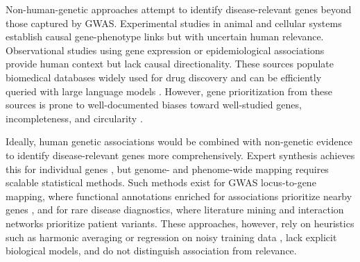 Non-human-genetic approaches attempt to identify disease-relevant genes beyond those captured by GWAS. Experimental studies in animal \cite{seok_genomic_2013,widjaja_inhibiting_2019} and cellular \cite{ben-david_genetic_2018,canon_clinical_2019} systems establish causal gene-phenotype links but with uncertain human relevance. Observational studies using gene expression \cite{wu_integrating_2022,rodriguez_machine_2021} or epidemiological associations \cite{barter_cholCesteryl_2011,bhatt_cardiovascular_2019} provide human context but lack causal directionality. These sources populate biomedical databases widely used for drug discovery \cite{swinney_how_2011,dornbos_evaluating_2022} and can be efficiently queried with large language models \cite{toufiq_harnessing_2023,hu_evaluation_2025}. However, gene prioritization from these sources is prone to well-documented biases toward well-studied genes, incompleteness, and circularity \cite{gillis_assessing_2013,haynes_gene_2018,stoeger_large_2018,tan_caution_2025}.

Ideally, human genetic associations would be combined with non-genetic evidence to identify disease-relevant genes more comprehensively. Expert synthesis achieves this for individual genes \cite{mountjoy_open_2022,karjalainen_genome-wide_2024}, but genome- and phenome-wide mapping requires scalable statistical methods. Such methods exist for GWAS locus-to-gene mapping, where functional annotations enriched for associations prioritize nearby genes \cite{pers_biological_2015,weeks_leveraging_2023}, and for rare disease diagnostics, where literature mining \cite{birgmeier_amelie_2020} and interaction networks \cite{smedley_next-generation_2015} prioritize patient variants. These approaches, however, rely on heuristics such as harmonic averaging \cite{buniello_open_2025} or regression on noisy training data \cite{weeks_leveraging_2023,schipper_prioritizing_2025}, lack explicit biological models, and do not distinguish association from relevance.

